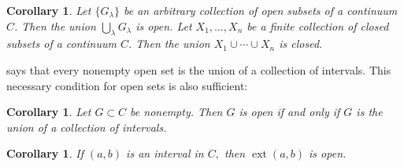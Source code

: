 \documentclass{amsart}
\newtheorem{definition}[theorem]{Definition}
\newtheorem{corollary}[theorem]{Corollary}
\newtheorem{exercise}[theorem]{Exercise}
\newcommand{\1}{\mathds{1}}
\DeclareMathOperator{\ext}{ext}
\numberwithin{equation}{section}
\numberwithin{theorem}{section}
\begin{document}
\begin{corollary}\label{fortop2}  Let $\{G_{\lambda} \}$ be an arbitrary collection of open subsets of a continuum $C$.  Then the union $\bigcup_{\lambda} G_{\lambda}$ is open.  Let $X_1, \dotsc, X_n$ be a finite collection of closed subsets of a continuum $C$.  Then the union $X_1 \cup \dotsm \cup X_n$ is closed.
\end{corollary}

 says that every nonempty open set is the union of a collection of intervals.  This necessary condition for open sets is also sufficient:


 \begin{corollary}
 Let $G \subset C$ be nonempty.  Then $G$ is open if and only if $G$ is the union of a collection of intervals.
\end{corollary}

\begin{corollary} If $(a, b)$ is an interval in $C,$ then $\ext(a,b)$ is open.
\end{corollary} 


%
%
%
%
%
%
%
%
%
\end{document}
